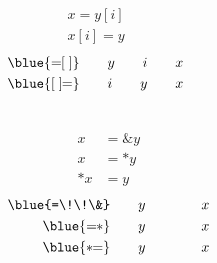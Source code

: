 \begin{frame}{}
  \begin{center}
    \begin{columns}
        \begin{align*}
          x = y[i] \\
          x[i] = y
        \end{align*}
        \begin{align*}
          \blue{=\!\![\;]} \qquad y \qquad i \qquad x \\
          \blue{[\;]\!\!=} \qquad i \qquad y \qquad x
        \end{align*}
    \end{columns}

    \pause
    \vspace{0.80cm}
    \begin{columns}
        \begin{align*}
          x &= \&y \\
          x &= \ast y \\
          \ast x &= y
        \end{align*}
        \pause
        \begin{align*}
          \blue{=\!\!\&} \qquad y \qquad \qquad x \\
          \blue{=\!\!\ast} \qquad y \qquad \qquad x \\
          \blue{\ast\!\!=} \qquad y \qquad \qquad x
        \end{align*}
    \end{columns}
  \end{center}
\end{frame}
